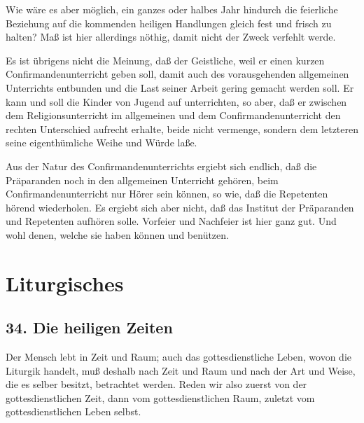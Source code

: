 Wie wäre es aber möglich, ein ganzes oder halbes Jahr hindurch die feierliche Beziehung auf die kommenden heiligen Handlungen gleich fest und frisch zu halten? Maß ist hier allerdings nöthig, damit nicht der Zweck verfehlt werde.

Es ist übrigens nicht die Meinung, daß der Geistliche, weil er einen kurzen Confirmandenunterricht geben soll, damit auch des vorausgehenden allgemeinen Unterrichts entbunden und die Last seiner Arbeit gering gemacht werden soll. Er kann und soll die Kinder von Jugend auf unterrichten, so aber, daß er zwischen dem Religionsunterricht im allgemeinen und dem Confirmandenunterricht den rechten Unterschied aufrecht erhalte, beide nicht vermenge, sondern dem letzteren seine eigenthümliche Weihe und Würde laße.

Aus der Natur des Confirmandenunterrichts ergiebt sich endlich, daß die Präparanden noch in den allgemeinen Unterricht gehören, beim Confirmandenunterricht nur Hörer sein können, so wie, daß die Repetenten hörend wiederholen. Es ergiebt sich aber nicht, daß das Institut der Präparanden und Repetenten aufhören solle. Vorfeier und Nachfeier ist hier ganz gut. Und wohl denen, welche sie haben können und benützen.

\chapter{Liturgisches}

\section{34. Die heiligen Zeiten}

Der Mensch lebt in Zeit und Raum; auch das gottesdienstliche Leben, wovon die Liturgik handelt, muß deshalb nach Zeit und Raum und nach der Art und Weise, die es selber besitzt, betrachtet werden. Reden wir also zuerst von der gottesdienstlichen Zeit, dann vom gottesdienstlichen Raum, zuletzt vom gottesdienstlichen Leben selbst.

